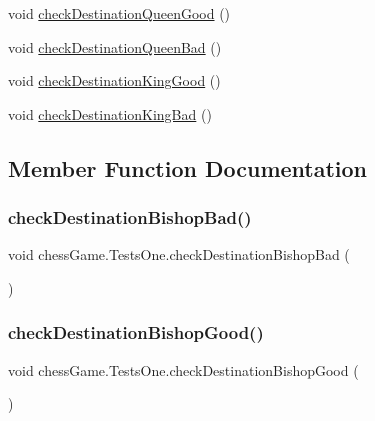 \begin{DoxyCompactItemize}
\item 
void \hyperlink{classchess_game_1_1_tests_one_af3bc1e11e160379dd884aa09ebb6d5b4}{check\+Destination\+Queen\+Good} ()
\item 
void \hyperlink{classchess_game_1_1_tests_one_a0c41ad0a4b9fe727288eb67f82065d6b}{check\+Destination\+Queen\+Bad} ()
\item 
void \hyperlink{classchess_game_1_1_tests_one_a256844b22f9f1d9137a49a72d1847fce}{check\+Destination\+King\+Good} ()
\item 
void \hyperlink{classchess_game_1_1_tests_one_aa2659eaaf952de90d827cb12b0e7c0e2}{check\+Destination\+King\+Bad} ()
\end{DoxyCompactItemize}


\subsection{Member Function Documentation}
\hypertarget{classchess_game_1_1_tests_one_a4bac71560076146506952017cbe45a3f}{}\label{classchess_game_1_1_tests_one_a4bac71560076146506952017cbe45a3f} 
\subsubsection{\texorpdfstring{check\+Destination\+Bishop\+Bad()}{checkDestinationBishopBad()}}
{\footnotesize\ttfamily void chess\+Game.\+Tests\+One.\+check\+Destination\+Bishop\+Bad (\begin{DoxyParamCaption}{ }\end{DoxyParamCaption})}

\hypertarget{classchess_game_1_1_tests_one_a8b2708dd6b64dbfc7387ba22844c9e9f}{}\label{classchess_game_1_1_tests_one_a8b2708dd6b64dbfc7387ba22844c9e9f} 
\subsubsection{\texorpdfstring{check\+Destination\+Bishop\+Good()}{checkDestinationBishopGood()}}
{\footnotesize\ttfamily void chess\+Game.\+Tests\+One.\+check\+Destination\+Bishop\+Good (\begin{DoxyParamCaption}{ }\end{DoxyParamCaption})}

